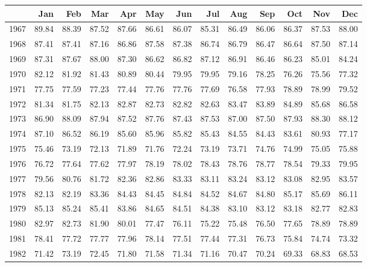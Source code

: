 \begin{longtable}{rrrrrrrrrrrrr}
  \hline
 & Jan & Feb & Mar & Apr & May & Jun & Jul & Aug & Sep & Oct & Nov & Dec \\ 
  \hline
1967 & 89.84 & 88.39 & 87.52 & 87.66 & 86.61 & 86.07 & 85.31 & 86.49 & 86.06 & 86.37 & 87.53 & 88.00 \\ 
  1968 & 87.41 & 87.41 & 87.16 & 86.86 & 87.58 & 87.38 & 86.74 & 86.79 & 86.47 & 86.64 & 87.50 & 87.14 \\ 
  1969 & 87.31 & 87.67 & 88.00 & 87.30 & 86.62 & 86.82 & 87.12 & 86.91 & 86.46 & 86.23 & 85.01 & 84.24 \\ 
  1970 & 82.12 & 81.92 & 81.43 & 80.89 & 80.44 & 79.95 & 79.95 & 79.16 & 78.25 & 76.26 & 75.56 & 77.32 \\ 
  1971 & 77.75 & 77.59 & 77.23 & 77.44 & 77.76 & 77.76 & 77.69 & 76.58 & 77.93 & 78.89 & 78.99 & 79.52 \\ 
  1972 & 81.34 & 81.75 & 82.13 & 82.87 & 82.73 & 82.82 & 82.63 & 83.47 & 83.89 & 84.89 & 85.68 & 86.58 \\ 
  1973 & 86.90 & 88.09 & 87.94 & 87.52 & 87.76 & 87.43 & 87.53 & 87.00 & 87.50 & 87.93 & 88.30 & 88.12 \\ 
  1974 & 87.10 & 86.52 & 86.19 & 85.60 & 85.96 & 85.82 & 85.43 & 84.55 & 84.43 & 83.61 & 80.93 & 77.17 \\ 
  1975 & 75.46 & 73.19 & 72.13 & 71.89 & 71.76 & 72.24 & 73.19 & 73.71 & 74.76 & 74.99 & 75.05 & 75.88 \\ 
  1976 & 76.72 & 77.64 & 77.62 & 77.97 & 78.19 & 78.02 & 78.43 & 78.76 & 78.77 & 78.54 & 79.33 & 79.95 \\ 
  1977 & 79.56 & 80.76 & 81.72 & 82.36 & 82.86 & 83.33 & 83.11 & 83.24 & 83.12 & 83.08 & 82.95 & 83.57 \\ 
  1978 & 82.13 & 82.19 & 83.36 & 84.43 & 84.45 & 84.84 & 84.52 & 84.67 & 84.80 & 85.17 & 85.69 & 86.11 \\ 
  1979 & 85.13 & 85.24 & 85.41 & 83.86 & 84.65 & 84.51 & 84.38 & 83.10 & 83.12 & 83.18 & 82.77 & 82.83 \\ 
  1980 & 82.97 & 82.73 & 81.90 & 80.01 & 77.47 & 76.11 & 75.22 & 75.48 & 76.50 & 77.65 & 78.89 & 78.89 \\ 
  1981 & 78.41 & 77.72 & 77.77 & 77.96 & 78.14 & 77.51 & 77.44 & 77.31 & 76.73 & 75.84 & 74.74 & 73.32 \\ 
  1982 & 71.42 & 73.19 & 72.45 & 71.80 & 71.58 & 71.34 & 71.16 & 70.47 & 70.24 & 69.33 & 68.83 & 68.53 \\ 

\end{longtable}
